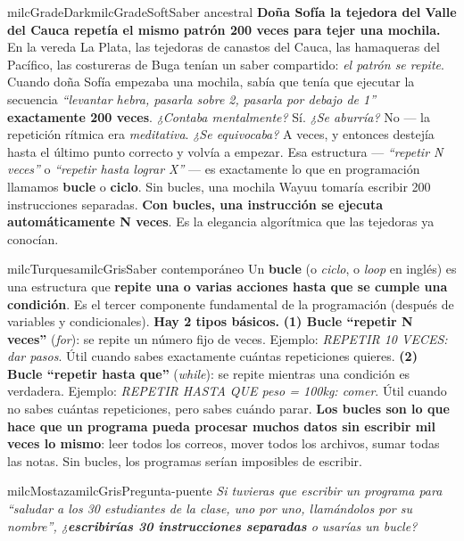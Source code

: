 \documentclass[11pt,letterpaper]{article}
\begin{document}
\begin{softbox}{milcGradeDark}{milcGradeSoft}{Saber ancestral}
\textbf{Doña Sofía la tejedora del Valle del Cauca repetía el mismo patrón 200 veces para tejer una mochila.} En la vereda La Plata, las tejedoras de canastos del Cauca, las hamaqueras del Pacífico, las costureras de Buga tenían un saber compartido: \emph{el patrón se repite}. Cuando doña Sofía empezaba una mochila, sabía que tenía que ejecutar la secuencia \emph{``levantar hebra, pasarla sobre 2, pasarla por debajo de 1''} \textbf{exactamente 200 veces}. \emph{¿Contaba mentalmente?} Sí. \emph{¿Se aburría?} No --- la repetición rítmica era \emph{meditativa}. \emph{¿Se equivocaba?} A veces, y entonces destejía hasta el último punto correcto y volvía a empezar. Esa estructura --- \emph{``repetir N veces''} o \emph{``repetir hasta lograr X''} --- es exactamente lo que en programación llamamos \textbf{bucle} o \textbf{ciclo}. Sin bucles, una mochila Wayuu tomaría escribir 200 instrucciones separadas. \textbf{Con bucles, una instrucción se ejecuta automáticamente N veces}. Es la elegancia algorítmica que las tejedoras ya conocían.
\end{softbox}

\begin{softbox}{milcTurquesa}{milcGris}{Saber contemporáneo}
Un \textbf{bucle} (o \emph{ciclo}, o \emph{loop} en inglés) es una estructura que \textbf{repite una o varias acciones hasta que se cumple una condición}. Es el tercer componente fundamental de la programación (después de variables y condicionales). \textbf{Hay 2 tipos básicos.} \textbf{(1) Bucle ``repetir N veces''} (\emph{for}): se repite un número fijo de veces. Ejemplo: \emph{REPETIR 10 VECES: dar pasos}. Útil cuando sabes exactamente cuántas repeticiones quieres. \textbf{(2) Bucle ``repetir hasta que''} (\emph{while}): se repite mientras una condición es verdadera. Ejemplo: \emph{REPETIR HASTA QUE peso = 100kg: comer}. Útil cuando no sabes cuántas repeticiones, pero sabes cuándo parar. \textbf{Los bucles son lo que hace que un programa pueda procesar muchos datos sin escribir mil veces lo mismo}: leer todos los correos, mover todos los archivos, sumar todas las notas. Sin bucles, los programas serían imposibles de escribir.
\end{softbox}

\begin{softbox}{milcMostaza}{milcGris}{Pregunta-puente}
\textit{Si tuvieras que escribir un programa para \emph{``saludar a los 30 estudiantes de la clase, uno por uno, llamándolos por su nombre''}, ¿\textbf{escribirías 30 instrucciones separadas} o usarías un bucle?}
\end{softbox}
\end{document}
